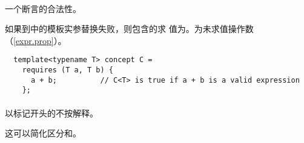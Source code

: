 
\paragraph{} %
一个断言的合法性。

\begin{note}
  如果到中的模板实参替换失败，则包含的求
  值为。为未求值操作数（\ref{expr.prop}）。
\end{note}

\begin{example}
  \begin{lstlisting}
  template<typename T> concept C =
    requires (T a, T b) {
      a + b;          // C<T> is true if a + b is a valid expression
    };
  \end{lstlisting}
\end{example}

\paragraph{} %
以标记开头的不按解释。

\begin{note}
  这可以简化区分和。
\end{note}
